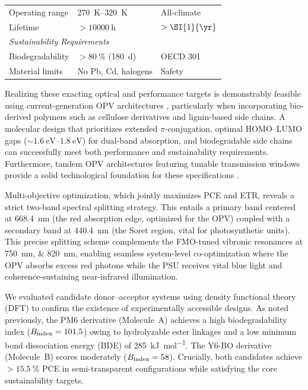 \begin{table}[ht]
\begin{tabular}{lll}
	\quad Operating range        & \SIrange{270}{320}{\kelvin}            & All-climate             \\
	\quad Lifetime               & $> \SI{10000}{\hour}$                  & $> \SI{1}{\yr}$         \\[0.5em]
	\multicolumn{3}{l}{\textit{Sustainability Requirements}}                                        \\
	\quad Biodegradability       & $> \SI{80}{\percent}$ (\SI{180}{\day}) & OECD 301                \\
	\quad Material limits        & No Pb, Cd, halogens                    & Safety                  \\ \bottomrule
\end{tabular}
\end{table}

Realizing these exacting optical and performance targets is demonstrably feasible using current-generation OPV architectures \cite{Li2020, Cui2021}, particularly when incorporating bio-derived polymers such as cellulose derivatives and lignin-based side chains. A molecular design that prioritizes extended $\pi$-conjugation, optimal HOMO--LUMO gaps ($\sim\SIrange{1.6}{1.8}{\electronvolt}$) for dual-band absorption, and biodegradable side chains can successfully meet both performance and sustainability requirements. Furthermore, tandem OPV architectures featuring tunable transmission windows provide a solid technological foundation for these specifications \cite{Li2020, Cui2021}.

Multi-objective optimization, which jointly maximizes PCE and ETR, reveals a strict two-band spectral splitting strategy. This entails a primary band centered at \SI{668.4}{\nano\meter} (the red absorption edge, optimized for the OPV) coupled with a secondary band at \SI{440.4}{\nano\meter} (the Soret region, vital for photosynthetic units). This precise splitting scheme complements the FMO-tuned vibronic resonances at \SIlist{750;820}{\nano\meter}, enabling seamless system-level co-optimization where the OPV absorbs excess red photons while the PSU receives vital blue light and coherence-sustaining near-infrared illumination.

We evaluated candidate donor--acceptor systems using density functional theory (DFT) to confirm the existence of experimentally accessible designs. As noted previously, the PM6 derivative (Molecule~A) achieves a high biodegradability index ($B_{\rm index} = 101.5$) owing to hydrolyzable ester linkages and a low minimum bond dissociation energy (BDE) of \SI{285}{\kilo\joule\per\mole}. The Y6-BO derivative (Molecule~B) scores moderately ($B_{\rm index} = 58$). Crucially, both candidates achieve $> \SI{15.5}{\percent}$ PCE in semi-transparent configurations while satisfying the core sustainability targets.


